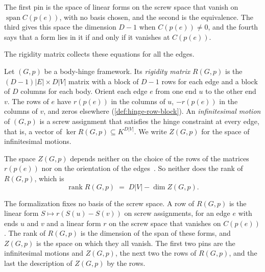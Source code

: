 \begin{fmlnote}
  The first pin is the space of linear forms on the screw space that
  vanish on $\operatorname{span} C(p(e))$, with no basis chosen, and the
  second is the equivalence. The third gives this space the dimension
  $D - 1$ when $C(p(e)) \neq 0$, and the fourth says that a form lies in
  it if and only if it vanishes at $C(p(e))$.
\end{fmlnote}

The rigidity matrix collects these equations for all the edges.

\begin{definition}
  \label{def:rigidity-matrix}
  \leanok
  Let $(G,p)$ be a body-hinge framework. Its \emph{rigidity matrix}
  $R(G,p)$ is the $(D-1)|E| \times D|V|$ matrix with a block of $D - 1$
  rows for each edge and a block of $D$ columns for each body. Orient
  each edge $e$ from one end $u$ to the other end $v$. The rows of $e$
  have $r(p(e))$ in the columns of $u$, $-r(p(e))$ in the columns of
  $v$, and zeros elsewhere (\cref{def:hinge-row-block}). An
  \emph{infinitesimal motion} of $(G,p)$ is a screw assignment that
  satisfies the hinge constraint at every edge, that is, a vector of
  $\ker R(G,p) \subseteq K^{D|V|}$. We write $Z(G,p)$ for the space of
  infinitesimal motions.
\end{definition}

The space $Z(G,p)$ depends neither on the choice of the rows of the
matrices $r(p(e))$ nor on the orientation of the
edges~\cite[p.~654]{katohTanigawa2011}. So neither does the rank of
$R(G,p)$, which is
\[
  \operatorname{rank} R(G,p) \;=\; D|V| - \dim Z(G,p).
\]

\begin{fmlnote}
  The formalization fixes no basis of the screw space. A row of
  $R(G,p)$ is the linear form $S \mapsto r(S(u) - S(v))$ on screw
  assignments, for an edge $e$ with ends $u$ and $v$ and a linear form
  $r$ on the screw space that vanishes on $C(p(e))$. The rank of
  $R(G,p)$ is the dimension of the span of these forms, and $Z(G,p)$ is
  the space on which they all vanish. The first two pins are the
  infinitesimal motions and $Z(G,p)$, the next two the rows of
  $R(G,p)$, and the last the description of $Z(G,p)$ by the rows.
\end{fmlnote}

